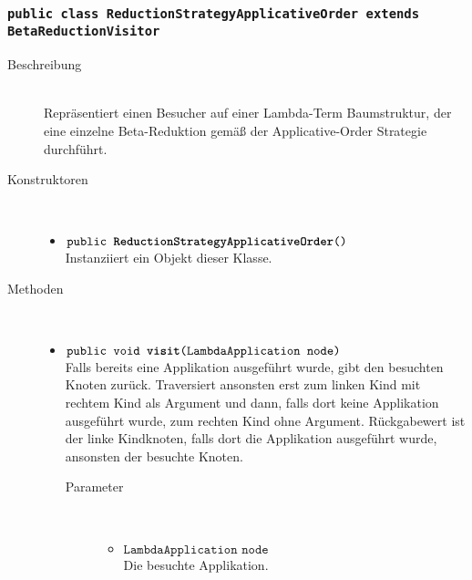 \subsubsection{\normalfont \texttt{public class \textbf{ReductionStrategyApplicativeOrder} extends BetaReductionVisitor}}

\begin{description}
\item[Beschreibung] \hfill \\ Repräsentiert einen Besucher auf einer Lambda-Term Baumstruktur, der eine einzelne Beta-Reduktion gemäß der Applicative-Order Strategie durchführt.

\item[Konstruktoren] \hfill \\
	\vspace{-.8cm}
	\begin{itemize}
		\item $\texttt{public \textbf{ReductionStrategyApplicativeOrder}()}$ \\ Instanziiert ein Objekt dieser Klasse.
	\end{itemize}

\item[Methoden] \hfill \\
	\vspace{-.8cm}
	\begin{itemize}
		\item $\texttt{public void \textbf{visit}(LambdaApplication node)}$ \\ Falls bereits eine Applikation ausgeführt wurde, gibt den besuchten Knoten zurück. Traversiert ansonsten erst zum linken Kind mit rechtem Kind als Argument und dann, falls dort keine Applikation ausgeführt wurde, zum rechten Kind ohne Argument. Rückgabewert ist der linke Kindknoten, falls dort die Applikation ausgeführt wurde, ansonsten der besuchte Knoten.
		\begin{description}
			\item[Parameter] \hfill \\
			\vspace{-.8cm}
			\begin{itemize}
				\item $\texttt{LambdaApplication node}$ \\ Die besuchte Applikation.
			\end{itemize}
		\end{description}
		

\end{itemize}
\end{description}
